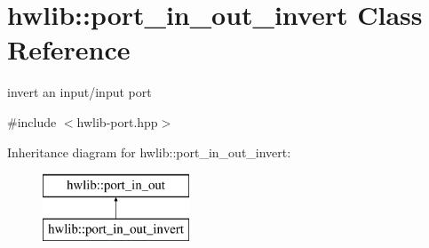 \hypertarget{classhwlib_1_1port__in__out__invert}{}\section{hwlib\+:\+:port\+\_\+in\+\_\+out\+\_\+invert Class Reference}
\label{classhwlib_1_1port__in__out__invert}


invert an input/input port  




{\ttfamily \#include $<$hwlib-\/port.\+hpp$>$}

Inheritance diagram for hwlib\+:\+:port\+\_\+in\+\_\+out\+\_\+invert\+:\begin{figure}[H]
\begin{center}
\leavevmode
\includegraphics[height=2.000000cm]{classhwlib_1_1port__in__out__invert}
\end{center}
\end{figure}
